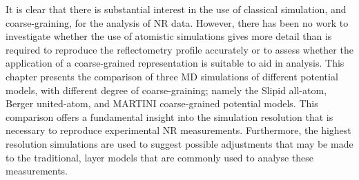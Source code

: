 It is clear that there is substantial interest in the use of classical simulation, and coarse-graining, for the analysis of NR data.
However, there has been no work to investigate whether the use of atomistic simulations gives more detail than is required to reproduce the reflectometry profile accurately or to assess whether the application of a coarse-grained representation is suitable to aid in analysis.
This chapter presents the comparison of three MD simulations of different potential models, with different degree of coarse-graining; namely the Slipid all-atom,\autocite{jambeck_derivation_2012} Berger united-atom,\autocite{berger_molecular_1997} and MARTINI coarse-grained potential models.\autocite{marrink_martini_2007}
This comparison offers a fundamental insight into the simulation resolution that is necessary to reproduce experimental NR measurements.
Furthermore, the highest resolution simulations are used to suggest possible adjustments that may be made to the traditional, layer models that are commonly used to analyse these measurements.

